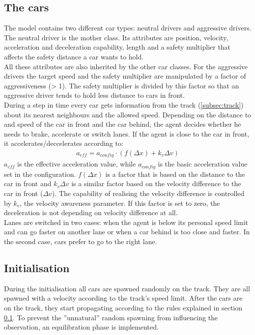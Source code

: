 \documentclass[11pt,a4paper,twocolumn]{article}
\begin{document}
\subsection{The cars} \label{subsec:cars}
The model contains two different car types: neutral drivers and aggressive drivers. The neutral driver is the mother class. Its attributes are position, velocity, acceleration and deceleration capability, length and a safety multiplier that affects the safety distance a car wants to hold. \\
All these attributes are also inherited by the other car classes. 
For the aggressive drivers the target speed and the safety multiplier are manipulated by a factor of aggressiveness (> 1). The safety multiplier is divided by this factor so that an aggressive driver tends to hold less distance to cars in front. \\
During a step in time every car gets information from the track (\ref{subsec:track}) about its nearest neighbours and the allowed speed. Depending on the distance to and speed of the car in front and the car behind, the agent decides whether he needs to brake, accelerate or switch lanes. If the agent is close to the car in front, it accelerates/deccelerates according to:
\begin{align}
a_{eff} = a_{config} \cdot (f(\Delta x) + k_v \Delta v) \label{eq:velo_param}
\end{align}
$a_{eff}$ is the effective acceleration value, while $a_{config}$ is the basic acceleration value set in the configuration. $f(\Delta x)$ is a factor that is based on the distance to the car in front and $k_v \Delta v$ is a similar factor based on the velocity difference to the car in front ($\Delta v$). The capability of realising the velocity difference is controlled by $k_v$, the velocity awareness parameter. If this factor is set to zero, the deceleration is not depending on velocity difference at all.\\

Lanes are switched in two cases: when the agent is below its personal speed limit and can go faster on another lane or when a car behind is too close and faster. In the second case, cars prefer to go to the right lane.\\

\subsection{Initialisation} \label{subsec:initialisation}
During the initialisation all cars are spawned randomly on the track. They are all spawned with a velocity according to the track's speed limit. After the cars are on the track, they start propagating according to the rules explained in section \ref{subsec:cars}. To prevent the ''unnatural'' random spawning from influencing the observation, an equilibration phase is implemented.
\end{document}
